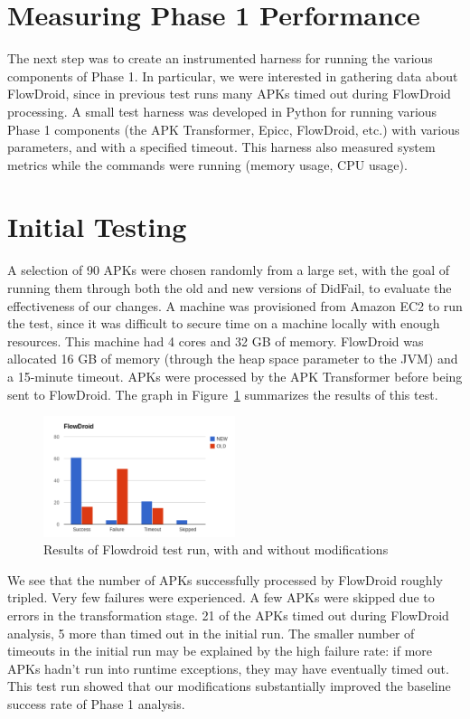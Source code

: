 \section{Measuring Phase 1 Performance}
The next step was to create an instrumented harness for running the various components of Phase 1.  In particular, we were interested in gathering data about FlowDroid, since in previous test runs many APKs timed out during FlowDroid processing.  A small test harness was developed in Python for running various Phase 1 components (the APK Transformer, Epicc, FlowDroid, etc.) with various parameters, and with a specified timeout.  This harness also measured system metrics while the commands  were running (memory usage, CPU usage).  

\section{Initial Testing}
A selection of 90 APKs were chosen randomly from a large set, with the goal of running them through both the old and new versions of DidFail, to evaluate the effectiveness of our changes.  A machine was provisioned from Amazon EC2 to run the test, since it was difficult to secure time on a machine locally with enough resources.  This machine had 4 cores and 32 GB of memory.  FlowDroid was allocated 16 GB of memory (through the heap space parameter to the JVM) and a 15-minute timeout.  APKs were processed by the APK Transformer before being sent to FlowDroid.  The graph in Figure~\ref{fig:initial_phase1} summarizes the results of this test.

\begin{figure}[h]
	\centering
	\includegraphics[width=0.50\textwidth]{flowdroid_success.pdf}
	\caption{Results of Flowdroid test run, with and without modifications}
	\label{fig:initial_phase1}
\end{figure}

We see that the number of APKs successfully processed by FlowDroid roughly tripled.   Very few failures were experienced.  A few APKs were skipped due to errors in the transformation stage.  21 of the APKs timed out during FlowDroid analysis, 5 more than timed out in the initial run.  The smaller number of timeouts in the initial run may be explained by the high failure rate: if more APKs hadn't run into runtime exceptions, they may have eventually timed out.  This test run showed that our modifications substantially improved the baseline success rate of Phase 1 analysis.

